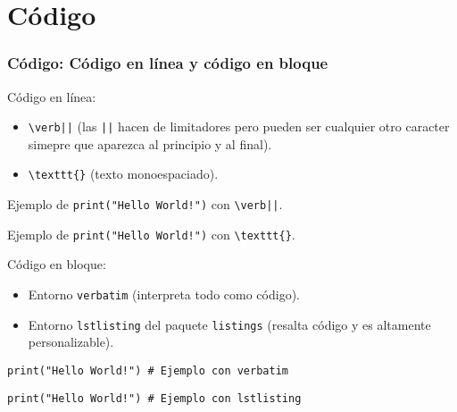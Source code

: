 \section{Código}

\begin{frame}[fragile]
\frametitle{Código: Código en línea y código en bloque}

Código en línea:
\begin{itemize}
    \item \verb/\verb||/ (las \texttt{||} hacen de limitadores pero pueden ser cualquier otro caracter simepre que aparezca al principio y al final).
    \item \verb|\texttt{}| (texto monoespaciado).
\end{itemize}

Ejemplo de \verb|print("Hello World!")| con  \verb/\verb||/.

Ejemplo de \texttt{print("Hello World!")} con \verb|\texttt{}|.

\vspace{0.5cm}

Código en bloque:
\begin{itemize}
    \item Entorno \texttt{verbatim} (interpreta todo como código).

    \item Entorno \texttt{lstlisting} del paquete \texttt{listings} (resalta código y es altamente personalizable).
\end{itemize}

\begin{verbatim}
print("Hello World!") # Ejemplo con verbatim
\end{verbatim}

\begin{lstlisting}
print("Hello World!") # Ejemplo con lstlisting
\end{lstlisting}

\end{frame}
